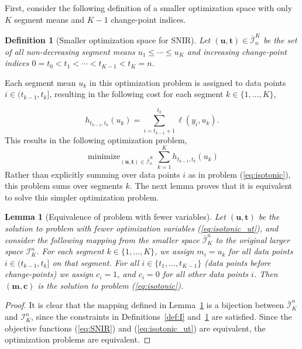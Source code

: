 \documentclass{article}
\newtheorem{lemma}{Lemma}
\newtheorem{definition}{Definition}
\DeclareMathOperator*{\minimize}{minimize}
\begin{document}
First, consider the following definition of a smaller optimization
space with only $K$ segment means and $K-1$ change-point indices.

\begin{definition}[Smaller optimization space for SNIR]
\label{def:Ibar}
  Let $(\mathbf u, \mathbf t)\in\bar{\mathcal I}_n^K$ be the set of
  all non-decreasing segment means $u_1\leq\cdots\leq u_K$ and
  increasing change-point indices $0=t_0<t_1<\cdots<t_{K-1}<t_K=n$.
\end{definition}

Each segment mean $u_k$ in this optimization problem is assigned to
data points $i\in(t_{k-1},t_k]$, resulting in the following cost
for each segment $k\in\{1, \dots, K\}$,

\begin{equation}
  \label{eq:h}
  h_{t_{k-1}, t_k}(u_k) = \sum_{i=t_{k-1}+1}^{t_k} \ell(y_i, u_k).
\end{equation}
This results in the following optimization problem,
\begin{equation}
  \label{eq:isotonic_ut}
  \minimize_{(\mathbf u, \mathbf t)\in\bar{\mathcal I}_n^K}
  \sum_{k=1}^K
  h_{t_{k-1}, t_k}(u_k)
\end{equation}
Rather than explicitly summing over data points $i$ as in problem
(\ref{eq:isotonic}), this problem sums over segments $k$. The next lemma
proves that it is equivalent to solve this simpler optimization problem.

\begin{lemma}[Equivalence of problem with fewer  variables]
  \label{lemma:fewer-variables}
  Let $(\mathbf u, \mathbf t)$ be the solution to problem with fewer
  optimization variables (\ref{eq:isotonic_ut}), and consider the
  following mapping from the smaller space $\bar{\mathcal I}_K^n$ to
  the original larger space $\mathcal I_K^n$. For each segment
  $k\in\{1,\dots,K\}$, we assign $m_i = u_k$ for all data points
  $i\in(t_{k-1},t_k]$ on that segment. For all
  $i\in\{t_1,\dots,t_{K-1}\}$ (data points before change-points) we
  assign $c_i=1$, and $c_i=0$ for all other data points $i$. Then
  $(\mathbf m, \mathbf c)$ is the solution to problem
  (\ref{eq:isotonic}).
\end{lemma}

\begin{proof}
  It is clear that the mapping defined in
  Lemma~\ref{lemma:fewer-variables} is a bijection between
  $\bar{\mathcal I}_K^n$ and $\mathcal I_K^n$, since the constraints
  in Definitions~\ref{def:I} and~\ref{def:Ibar} are satisfied. Since
  the objective functions (\ref{eq:SNIR}) and (\ref{eq:isotonic_ut})
  are equivalent, the optimization problems are equivalent.
\end{proof}
\end{document}
